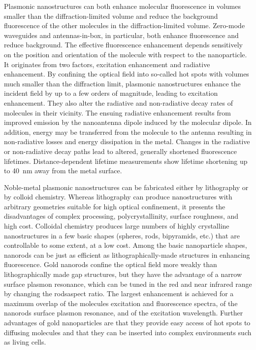 Plasmonic nanostructures can both enhance molecular fluorescence in volumes smaller than the diffraction-limited volume and reduce the background fluorescence of the other molecules in the diffraction-limited volume.
Zero-mode waveguides and antennas-in-box, in particular, both enhance fluorescence and reduce background.\cite{levene2003zeromode,kinkhabwala2012fluorescence,punj2013a,yuan2013thousandfold,punj2013gold} 
The effective fluorescence enhancement depends sensitively on the position and orientation of the molecule with respect to the nanoparticle.
It originates from two factors, excitation enhancement and radiative enhancement.
By confining the optical field into so-called hot spots with volumes much smaller than the diffraction limit,\cite{schuller2010plasmonics} plasmonic nanostructures enhance the incident field by up to a few orders of magnitude, leading to excitation enhancement.\cite{yuan2013thousandfold,anger2006enhancement,kinkhabwala2009large,
acuna2012fluorescence,busson2012accelerated,holzmeister2014quantum,khatua2014resonant}
They also alter the radiative and non-radiative decay rates of molecules in their vicinity.
The ensuing radiative enhancement results from improved emission by the nanoantenna dipole induced by the molecular dipole.
In addition, energy may be transferred from the molecule to the antenna resulting in non-radiative losses and energy dissipation in the metal.
Changes in the radiative or non-radiative decay paths lead to altered, generally shortened fluorescence lifetimes.\cite{khatua2014resonant,liu2007quantized,lakowicz2001radiative,dulkeith2005gold,seelig2007nanoparticleinduced,muskens2007strong,pelton2015modified}
Distance-dependent lifetime measurements show lifetime shortening up to \SI{40}{\nm} away from the metal surface.\cite{seelig2007nanoparticleinduced}

Noble-metal plasmonic nanostructures can be fabricated either by lithography or by colloid chemistry.\cite{zijlstra2011single}
Whereas lithography can produce nanostructures with arbitrary geometries suitable for high optical confinement, it presents the disadvantages of complex processing, polycrystallinity, surface roughness, and high cost.
Colloidal chemistry produces large numbers of highly crystalline nanostructures in a few basic shapes (spheres, rods, bipyramids, etc.) that are controllable to some extent, at a low cost. 
Among the basic nanoparticle shapes, nanorods\cite{yuan2013thousandfold} can be just as efficient as lithographically-made structures\cite{punj2013a,kinkhabwala2009large} in enhancing fluorescence.
Gold nanorods confine the optical field more weakly than lithographically made gap structures, but they have the advantage of a narrow surface plasmon resonance, which can be tuned in the red and near infrared range by changing the rods\textquotesingle aspect ratio.\cite{khatua2014resonant}
The largest enhancement is achieved for a maximum overlap of the molecule\textquotesingle s excitation and fluorescence spectra, of the nanorod\textquotesingle s surface plasmon resonance, and of the excitation wavelength.
Further advantages of gold nanoparticles are that they provide easy access of hot spots to diffusing molecules and that they can be inserted into complex environments such as living cells.

